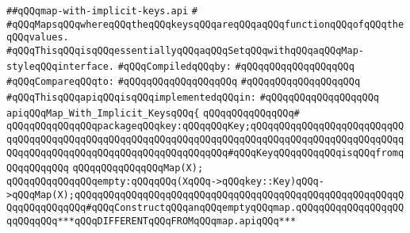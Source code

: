 \label{src/lib/src/map-with-implicit-keys.api}
\verb|##qQQqmap-with-implicit-keys.api|\newline
\verb|#|\newline
\verb|#qQQqMapsqQQqwhereqQQqtheqQQqkeysqQQqareqQQqaqQQqfunctionqQQqofqQQqtheqQQqvalues.|\newline
\verb|#qQQqThisqQQqisqQQqessentiallyqQQqaqQQqSetqQQqwithqQQqaqQQqMap-styleqQQqinterface.|\newline
\newline
\verb|#qQQqCompiledqQQqby:|\newline
\verb|#qQQqqQQqqQQqqQQqqQQq|\newline
\newline
\verb|#qQQqCompareqQQqto:|\newline
\verb|#qQQqqQQqqQQqqQQqqQQq|\newline
\verb|#qQQqqQQqqQQqqQQqqQQq|\newline
\newline
\verb|#qQQqThisqQQqapiqQQqisqQQqimplementedqQQqin:|\newline
\verb|#qQQqqQQqqQQqqQQqqQQq|\newline
\newline
\newline
\newline
\newline
\newline
\verb|apiqQQqMap_With_Implicit_KeysqQQq{|\newline
\verb|qQQqqQQqqQQqqQQq#|\newline
\verb|qQQqqQQqqQQqqQQqpackageqQQqkey:qQQqqQQqKey;qQQqqQQqqQQqqQQqqQQqqQQqqQQqqQQqqQQqqQQqqQQqqQQqqQQqqQQqqQQqqQQqqQQqqQQqqQQqqQQqqQQqqQQqqQQqqQQqqQQqqQQqqQQqqQQqqQQqqQQqqQQqqQQqqQQqqQQq#qQQqKeyqQQqqQQqqQQqisqQQqfromqQQqqQQqqQQq|\newline
\newline
\verb|qQQqqQQqqQQqqQQqMap(X);|\newline
\newline
\verb|qQQqqQQqqQQqqQQqempty:qQQqqQQq(XqQQq->qQQqkey::Key)qQQq->qQQqMap(X);qQQqqQQqqQQqqQQqqQQqqQQqqQQqqQQqqQQqqQQqqQQqqQQqqQQqqQQqqQQqqQQqqQQqqQQq#qQQqConstructqQQqanqQQqemptyqQQqmap.qQQqqQQqqQQqqQQqqQQqqQQqqQQq***qQQqDIFFERENTqQQqFROMqQQqmap.apiqQQq***|\newline
